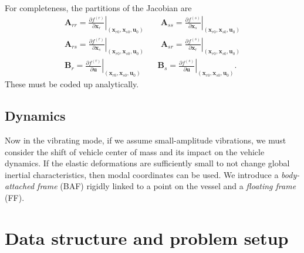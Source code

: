 \documentclass[10pt]{article}
\newcommand{\pp}[2]{\frac{\partial #1}{\partial #2}}
\newcommand{\mbf}[1]{\mathbf{#1}}
\newcommand{\beq}{\begin{equation}\begin{aligned}}
\newcommand{\eeq}{\end{aligned}\end{equation}}
\begin{document}
For completeness, the partitions of the Jacobian are
\beq
\mbf{A}_{rr} = \left. \pp{f^{(r)}}{\mbf{x}_r} \right|_{(\mbf{x}_{r0}, \mbf{x}_{s0}, \mbf{u}_0)}
\qquad
\mbf{A}_{ss} = \left. \pp{f^{(s)}}{\mbf{x}_s} \right|_{(\mbf{x}_{r0}, \mbf{x}_{s0}, \mbf{u}_0)}
\\
\mbf{A}_{rs} = \left. \pp{f^{(r)}}{\mbf{x}_s} \right|_{(\mbf{x}_{r0}, \mbf{x}_{s0}, \mbf{u}_0)}
\qquad
\mbf{A}_{sr} = \left. \pp{f^{(s)}}{\mbf{x}_r} \right|_{(\mbf{x}_{r0}, \mbf{x}_{s0}, \mbf{u}_0)}
\\
\mbf{B}_{r} = \left. \pp{f^{(r)}}{\mbf{u}} \right|_{(\mbf{x}_{r0}, \mbf{x}_{s0}, \mbf{u}_0)}
\qquad
\mbf{B}_{s} = \left. \pp{f^{(s)}}{\mbf{u}} \right|_{(\mbf{x}_{r0}, \mbf{x}_{s0}, \mbf{u}_0)}.
\eeq
These must be coded up analytically.

\subsection{Dynamics}
Now in the vibrating mode, if we assume small-amplitude vibrations, we must consider the shift of vehicle center of mass and its impact on the vehicle dynamics.
If the elastic deformations are sufficiently small to not change global inertial characteristics, then modal coordinates can be used.
We introduce a \emph{body-attached frame} (BAF) rigidly linked to a point on the vessel and a \emph{floating frame} (FF).

\section{Data structure and problem setup}
\end{document}
